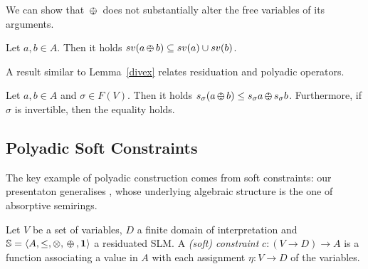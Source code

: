 \documentclass{llncs}
\def\monid{{\mathbf 0}}
\def\monop{\otimes}
\def\odiv{\, {\ominus\hspace{-7.7pt} \div} \,}
\def\monid{\mathbf{1}}
\begin{document}
We can show that $\odiv$ does not substantially alter the free variables of its arguments.

\begin{lemma}
Let $a, b \in A$. Then it holds $sv(a \odiv b) \subseteq sv(a) \cup sv(b)$. 
\end{lemma}



%

A result similar to Lemma~\ref{divex} relates residuation and polyadic operators.


\begin{lemma}
Let $a, b \in A$ and $\sigma \in F(V)$. Then it holds
$s_\sigma (a \odiv b) \leq s_\sigma a \odiv s_\sigma b$.
Furthermore, if $\sigma$ is invertible, then the equality holds.
\end{lemma}

\subsection{Polyadic Soft Constraints}\label{sec:softconstraints}
\label{subsec:inst} 
The key example of polyadic construction comes from soft constraints: 
our presentaton generalises \cite{scc},
whose underlying algebraic structure is the one of absorptive semirings.

\begin{definition}\label{def:softconstraints}
	Let $V$ be a set of variables, $D$ a finite domain of interpretation
	and ${\mathbb S} = \langle A, \leq, \monop, \odiv, \monid \rangle$ a residuated SLM.
	A \emph{(soft) constraint} $c: (V \rightarrow D) \rightarrow
	A$ is a function associating a value in $A$ with each assignment
	$\eta: V\rightarrow D$ of the variables.
\end{definition}
\end{document}
